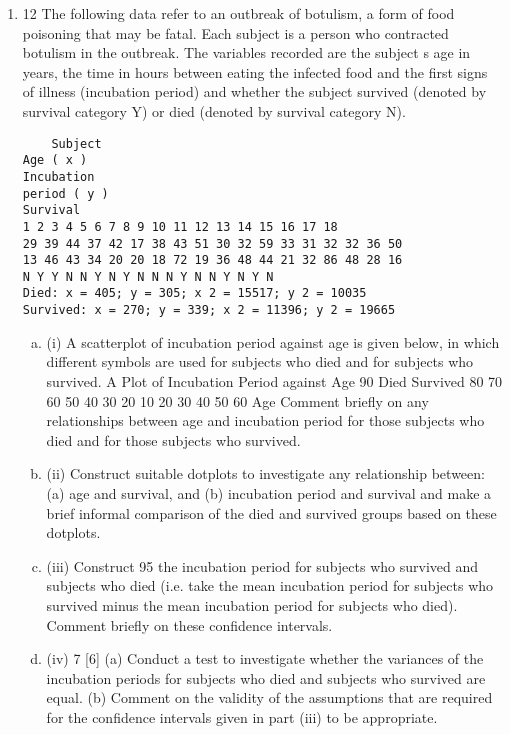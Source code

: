 \documentclass[a4paper,12pt]{article}
\begin{document}
\begin{enumerate}
\item
12
The following data refer to an outbreak of botulism, a form of food poisoning that
may be fatal. Each subject is a person who contracted botulism in the outbreak. The
variables recorded are the subject s age in years, the time in hours between eating the
infected food and the first signs of illness (incubation period) and whether the subject
survived (denoted by survival category Y) or died (denoted by survival category N).
\begin{verbatim}
    Subject
Age ( x )
Incubation
period ( y )
Survival
1 2 3 4 5 6 7 8 9 10 11 12 13 14 15 16 17 18
29 39 44 37 42 17 38 43 51 30 32 59 33 31 32 32 36 50
13 46 43 34 20 20 18 72 19 36 48 44 21 32 86 48 28 16
N Y Y N N Y N Y N N N Y N N Y N Y N
Died: x = 405; y = 305; x 2 = 15517; y 2 = 10035
Survived: x = 270; y = 339; x 2 = 11396; y 2 = 19665
\end{verbatim}

\begin{enumerate}[(a)]
\item (i)
A scatterplot of incubation period against age is given below, in which
different symbols are used for subjects who died and for subjects who
survived.
A Plot of Incubation Period against Age
90
Died
Survived
80
70
60
50
40
30
20
10
20
30
40
50
60
Age
Comment briefly on any relationships between age and incubation period for
those subjects who died and for those subjects who survived.
\item  (ii)
Construct suitable dotplots to investigate any relationship between:
(a) age and survival, and
(b) incubation period and survival
and make a brief informal comparison of the died and survived groups based
on these dotplots.
\item (iii)
Construct 95%
the incubation period for subjects who survived and subjects who died (i.e.
take the mean incubation period for subjects who survived minus the mean
incubation period for subjects who died).
Comment briefly on these confidence intervals.
\item  (iv)
7
[6]
(a) Conduct a test to investigate whether the variances of the incubation
periods for subjects who died and subjects who survived are equal.
(b) Comment on the validity of the assumptions that are required for the
confidence intervals given in part (iii) to be appropriate.
\end{enumerate}
\newpage


\end{enumerate}
\end{document}
